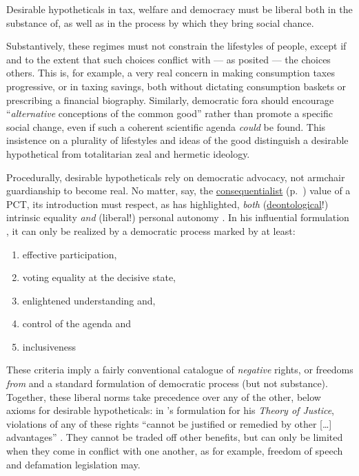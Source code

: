 Desirable hypotheticals in tax, welfare and democracy must be liberal both in the substance of, as well as in the process by which they bring social chance.

Substantively, these regimes must not constrain the lifestyles of people, except if and to the extent that such choices conflict with --- as \citeauthor{Rawls-1971} posited --- the choices others.
This is, for example, a very real concern in making consumption taxes progressive, or in taxing savings, both without dictating consumption baskets or prescribing a financial biography.
Similarly, democratic fora should encourage  ``\emph{alternative} conceptions of the common good'' \citep[18, emphasis added]{Cohen-1989-aa} rather than promote a specific social change, even if such a coherent scientific agenda \emph{could} be found.
This insistence on a plurality of lifestyles and ideas of the good distinguish a desirable hypothetical from totalitarian zeal and hermetic ideology.

Procedurally, desirable hypotheticals rely on democratic advocacy, not armchair guardianship to become real.
No matter, say, the \hyperref[itm:consequentialism]{consequentialist} (p.~\pageref{itm:consequentialism}) value of a \gls{PCT}, its introduction must respect, as \citeauthor{Dahl-1989-aa} has highlighted, \emph{both} (\hyperref[itm:deontological]{deontological}!) intrinsic equality \citeyearpar[84]{Dahl-1989-aa} \emph{and} (liberal!) personal autonomy \citeyearpar[97ff]{Dahl-1989-aa}.
In his influential formulation \citep[109ff.]{Dahl-1989-aa}, it can only be realized by a democratic process marked by at least:

\begin{enumerate}
	\item effective participation,
	\item voting equality at the decisive state,
	\item enlightened understanding and,
	\item control of the agenda and
	\item inclusiveness %
\end{enumerate}

These criteria imply a fairly conventional catalogue of \emph{negative} rights, or freedoms \emph{from} and a standard formulation of democratic process (but not substance).
Together, these liberal norms take precedence over any of the other, below axioms for desirable hypotheticals:
in \citeauthor{Rawls-1971}'s formulation for his \emph{Theory of Justice}, violations of any of these rights ``cannot be justified or remedied by other [\ldots] advantages'' \citeyearpar[81]{Rawls-1971}.
They cannot be traded off other benefits, but can only be limited when they come in conflict with one another, as for example, freedom of speech and defamation legislation may.

